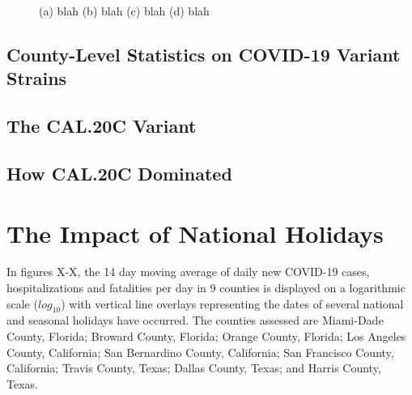 \documentclass[]{article}
\begin{document}
\begin{figure}
	\caption{(a) blah (b) blah (c) blah (d) blah}
	\label{fig:foobar}
\end{figure}

\FloatBarrier
\subsection{County-Level Statistics on COVID-19 Variant Strains}
\subsection{The CAL.20C Variant}
\subsection{How CAL.20C Dominated}

\FloatBarrier
\vspace{5mm}

\section{The Impact of National Holidays}

\indent In figures X-X, the 14 day moving average of daily new COVID-19 cases, hospitalizations and fatalities per day in 9 counties is displayed on a logarithmic scale ($log_{10}$) with vertical line overlays representing the dates of several national and seasonal holidays have occurred. The counties assessed are Miami-Dade County, Florida; Broward County, Florida; Orange County, Florida; Los Angeles County, California; San Bernardino County, California; San Francisco County, California; Travis County, Texas; Dallas County, Texas; and Harris County, Texas.
\end{document}
